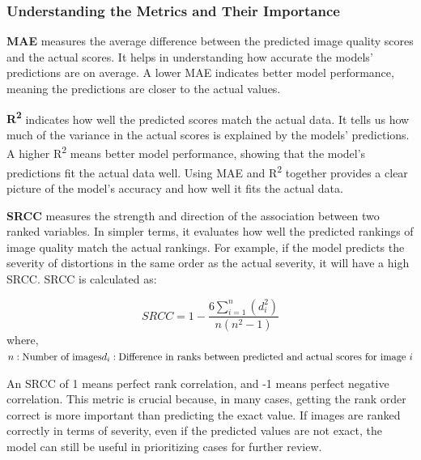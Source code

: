 \subsubsection{Understanding the Metrics and Their Importance}
\label{subsub:UnderstandingMetrics}
\textbf{MAE} measures the average difference between the predicted image quality scores and the actual scores. It helps in understanding how accurate the models’ predictions are on average. A lower MAE indicates better model performance, meaning the predictions are closer to the actual values. \par
\vspace{\baselineskip}
\noindent
\textbf{R\textsuperscript{2}} indicates how well the predicted scores match the actual data. It tells us how much of the variance in the actual scores is explained by the models’ predictions. A higher R\textsuperscript{2} means better model performance, showing that the model’s predictions fit the actual data well. Using MAE and R\textsuperscript{2} together provides a clear picture of the model’s accuracy and how well it fits the actual data. \par
\vspace{\baselineskip}
\noindent
\textbf{SRCC} measures the strength and direction of the association between two ranked variables. In simpler terms, it evaluates how well the predicted rankings of image quality match the actual rankings. For example, if the model predicts the severity of distortions in the same order as the actual severity, it will have a high SRCC. SRCC is calculated as: \par
\begin{equation}
    SRCC = 1 - \frac{6 \sum_{i=1}^n (d_i^2)}{n(n^2 - 1)}
\end{equation}
\noindent
where, \newline
$n: \text{Number of images} \\ d_i: \text{Difference in ranks between predicted and actual scores for image } i$ \par
\vspace{\baselineskip}
\noindent
An SRCC of 1 means perfect rank correlation, and -1 means perfect negative correlation. This metric is crucial because, in many cases, getting the rank order correct is more important than predicting the exact value. If images are ranked correctly in terms of severity, even if the predicted values are not exact, the model can still be useful in prioritizing cases for further review. \par
\vspace{\baselineskip}

